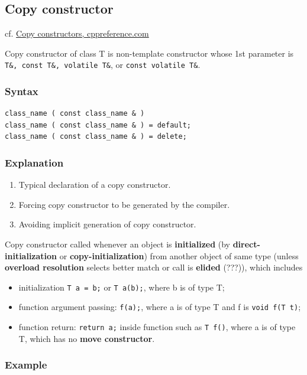 \documentclass[10pt]{amsart}
\begin{document}
\subsection{Copy constructor}

cf. \href{http://en.cppreference.com/w/cpp/language/copy_constructor}{Copy constructors, cppreference.com}

Copy constructor of class T is non-template constructor whose 1st parameter is \verb|T&, const T&, volatile T&|, or \verb|const volatile T&|.  

\subsubsection{Syntax}  

\begin{lstlisting}
class_name ( const class_name & )  
class_name ( const class_name & ) = default;  
class_name ( const class_name & ) = delete;
\end{lstlisting}  

\subsubsection{Explanation}  
\begin{enumerate}
	\item Typical declaration of a copy constructor.  
	\item Forcing copy constructor to be generated by the compiler.  
	\item Avoiding implicit generation of copy constructor.  
\end{enumerate}


Copy constructor called whenever an object is \textbf{initialized} (by \textbf{direct-initialization} or \textbf{copy-initialization}) from another object of same type (unless \textbf{overload resolution} selects better match or call is \textbf{elided} (???)), which includes  
\begin{itemize}
	\item initialization \verb|T a = b;| or \verb|T a(b);|, where b is of type T;  
	\item function argument passing: \verb|f(a);|, where a is of type T and f is \verb|void f(T t)|;  
	\item function return: \verb|return a;| inside function such as \verb|T f()|, where a is of type T, which has no \textbf{move constructor}.   
\end{itemize}

\subsubsection{Example}  
	
\end{document}
